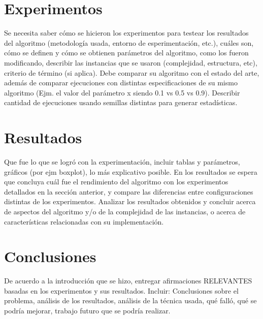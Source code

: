 \documentclass[letter, 10pt]{article}
\begin{document}
\section{Experimentos}
Se necesita saber c\'omo se hicieron los experimentos para testear los resultados del algoritmo (metodolog\'ia usada, entorno de esperimentaci\'on, etc.), cu\'ales son, c\'omo se definen y c\'omo se obtienen par\'ametros del algoritmo, como los fueron modificando, describir las instancias que se usaron (complejidad, estructura, etc), criterio de t\'ermino (si aplica). Debe comparar su algoritmo con el estado del arte, adem\'as de comparar ejecuciones con distintas especificaciones de su mismo algoritmo (Ejm. el valor del par\'ametro x siendo 0.1 vs 0.5 vs 0.9). Describir cantidad de ejecuciones usando semillas distintas para generar estad\'isticas.

\section{Resultados}
Que fue lo que se logr\'o con la experimentaci\'on, incluir tablas y par\'ametros, gr\'aficos (por ejm boxplot), lo m\'as explicativo posible. En los resultados se espera que concluya cu\'al fue el rendimiento del algoritmo con los experimentos detallados en la secci\'on anterior, y compare las diferencias entre configuraciones distintas de los experimentos. Analizar los resultados obtenidos y concluir acerca de aspectos del algoritmo y/o de la complejidad de las instancias, o acerca de caracter\'isticas relacionadas con su implementaci\'on.

\section{Conclusiones}
De acuerdo a la introducci\'on que se hizo, entregar afirmaciones RELEVANTES basadas en los experimentos
y sus resultados. Incluir: Conclusiones sobre el problema, an\'alisis de los resultados, an\'alisis de la t\'ecnica usada, qu\'e fall\'o, qu\'e se podr\'ia mejorar, trabajo futuro que se podr\'ia realizar.




\end{document}
